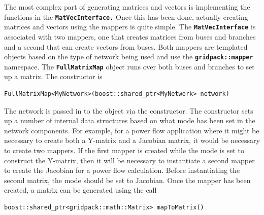 




The most complex part of generating matrices and vectors is implementing the functions in the \texttt{\textbf{MatVecInterface.}} Once this has been done, actually creating matrices and vectors using the mappers is quite simple. The \texttt{\textbf{MatVecInterface}} is associated with two mappers, one that creates matrices from buses and branches and a second that can create vectors from buses. Both mappers are templated objects based on the type of network being used and use the \texttt{\textbf{gridpack::mapper}} namespace. The \texttt{\textbf{FullMatrixMap}} object runs over both buses and branches to set up a matrix. The constructor is

{
\color{red}
\begin{Verbatim}[fontseries=b]
FullMatrixMap<MyNetwork>(boost::shared_ptr<MyNetwork> network)
\end{Verbatim}
}

The network is passed in to the object via the constructor. The constructor sets up a number of internal data structures based on what mode has been set in the network components. For example, for a power flow application where it might be necessary to create both a Y-matrix and a Jacobian matrix, it would be necessary to create two mappers. If the first mapper is created while the mode is set to construct the Y-matrix, then it will be necessary to instantiate a second mapper to create the Jacobian for a power flow calculation. Before instantiating the second matrix, the mode should be set to Jacobian.
Once the mapper has been created, a matrix can be generated using the call

{
\color{red}
\begin{Verbatim}[fontseries=b]
boost::shared_ptr<gridpack::math::Matrix> mapToMatrix()
\end{Verbatim}
}

